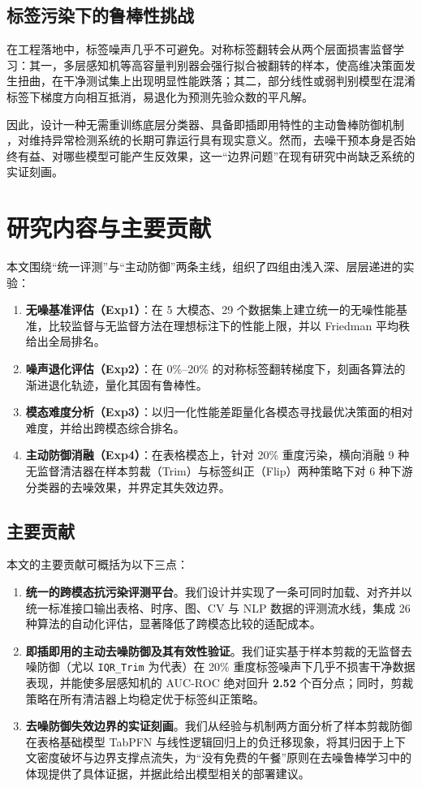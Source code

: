 \subsection{标签污染下的鲁棒性挑战}
在工程落地中，标签噪声几乎不可避免。对称标签翻转会从两个层面损害监督学习：其一，多层感知机等高容量判别器会强行拟合被翻转的样本，使高维决策面发生扭曲，在干净测试集上出现明显性能跌落；其二，部分线性或弱判别模型在混淆标签下梯度方向相互抵消，易退化为预测先验众数的平凡解。

因此，设计一种无需重训练底层分类器、具备即插即用特性的主动鲁棒防御机制 \cite{jiang2020trim}，对维持异常检测系统的长期可靠运行具有现实意义。然而，去噪干预本身是否始终有益、对哪些模型可能产生反效果，这一“边界问题”在现有研究中尚缺乏系统的实证刻画。

\section{研究内容与主要贡献}

本文围绕“统一评测”与“主动防御”两条主线，组织了四组由浅入深、层层递进的实验：

\begin{enumerate}
    \item \textbf{无噪基准评估（Exp1）}：在 5 大模态、29 个数据集上建立统一的无噪性能基准，比较监督与无监督方法在理想标注下的性能上限，并以 Friedman 平均秩给出全局排名。
    \item \textbf{噪声退化评估（Exp2）}：在 0\%--20\% 的对称标签翻转梯度下，刻画各算法的渐进退化轨迹，量化其固有鲁棒性。
    \item \textbf{模态难度分析（Exp3）}：以归一化性能差距量化各模态寻找最优决策面的相对难度，并给出跨模态综合排名。
    \item \textbf{主动防御消融（Exp4）}：在表格模态上，针对 20\% 重度污染，横向消融 9 种无监督清洁器在样本剪裁（Trim）与标签纠正（Flip）两种策略下对 6 种下游分类器的去噪效果，并界定其失效边界。
\end{enumerate}

\subsection{主要贡献}
本文的主要贡献可概括为以下三点：
\begin{enumerate}
    \item \textbf{统一的跨模态抗污染评测平台}。我们设计并实现了一条可同时加载、对齐并以统一标准接口输出表格、时序、图、CV 与 NLP 数据的评测流水线，集成 26 种算法的自动化评估，显著降低了跨模态比较的适配成本。
    \item \textbf{即插即用的主动去噪防御及其有效性验证}。我们证实基于样本剪裁的无监督去噪防御（尤以 \texttt{IQR\_Trim} 为代表）在 20\% 重度标签噪声下几乎不损害干净数据表现，并能使多层感知机的 AUC-ROC 绝对回升 \textbf{2.52} 个百分点；同时，剪裁策略在所有清洁器上均稳定优于标签纠正策略。
    \item \textbf{去噪防御失效边界的实证刻画}。我们从经验与机制两方面分析了样本剪裁防御在表格基础模型 TabPFN \cite{hollmann2022tabpfn} 与线性逻辑回归上的负迁移现象，将其归因于上下文密度破坏与边界支撑点流失，为“没有免费的午餐”原则在去噪鲁棒学习中的体现提供了具体证据，并据此给出模型相关的部署建议。
\end{enumerate}

